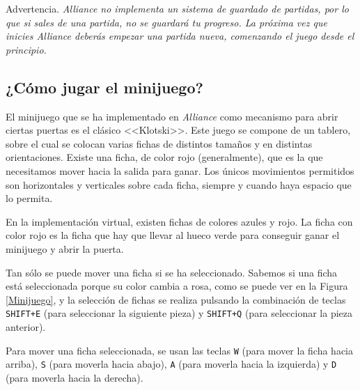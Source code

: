\renewcommand\bcStyleTitre[1]{\large\hspace*{1.8in}\textcolor{red!100}{#1}}
\begin{bclogo}[
  couleur=red!15,
  arrondi=0.25,
  logo=\hspace*{1in}\bctakecare,
  barre=none,
  noborder=true]{\hspace*{0.15in} Advertencia.}
\itshape \vspace*{0.15in}
\textit{Alliance} no implementa un sistema de guardado de partidas, por lo que si sales de una partida, no se guardará tu progreso. La próxima vez que inicies \textit{Alliance} deberás empezar una partida nueva, comenzando el juego desde el principio.
\end{bclogo}


\subsection{¿Cómo jugar el minijuego?}

El minijuego que se ha implementado en \textit{Alliance} como mecanismo para abrir ciertas puertas es el clásico <<Klotski>>. Este juego se compone de un tablero, sobre el cual se colocan varias fichas de distintos tamaños y en distintas orientaciones. Existe una ficha, de color rojo (generalmente), que es la que necesitamos mover hacia la salida para ganar. Los únicos movimientos permitidos son horizontales y verticales sobre cada ficha, siempre y cuando haya espacio que lo permita.

En la implementación virtual, existen fichas de colores azules y rojo. La ficha con color rojo es la ficha que hay que llevar al hueco verde para conseguir ganar el minijuego y abrir la puerta. 

Tan sólo se puede mover una ficha si se ha seleccionado. Sabemos si una ficha está seleccionada porque su color cambia a rosa, como se puede ver en la Figura \ref{Minijuego}, y la selección de fichas se realiza pulsando la combinación de teclas \texttt{SHIFT+E} (para seleccionar la siguiente pieza) y \texttt{SHIFT+Q} (para seleccionar la pieza anterior).

Para mover una ficha seleccionada, se usan las teclas \texttt{W} (para mover la ficha hacia arriba), \texttt{S} (para moverla hacia abajo), \texttt{A} (para moverla hacia la izquierda) y \texttt{D} (para moverla hacia la derecha).

